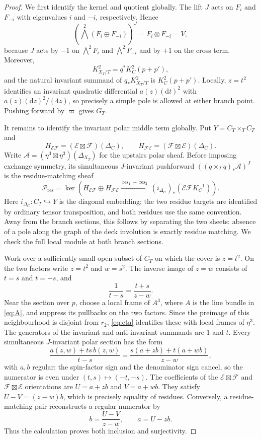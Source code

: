 \documentclass[11pt,a4paper,dvipsnames]{amsart}
\numberwithin{equation}{section}
\theoremstyle{plain}
\theoremstyle{definition}
\newcommand{\cE}{\mathcal E}
\newcommand{\cF}{\mathcal F}
\newcommand{\dd}{\mathrm d}
\begin{document}
\begin{proof}
We first identify the kernel and quotient globally.  The lift $J$ acts on
$F_i$ and $F_{-i}$ with eigenvalues $i$ and $-i$, respectively.  Hence
$$
 \left(\bigwedge^2(F_i\oplus F_{-i})\right)^J
 =F_i\otimes F_{-i}=V,
$$
because $J$ acts by $-1$ on $\bigwedge^2F_i$ and
$\bigwedge^2F_{-i}$ and by $+1$ on the cross term.  Moreover,
$$
 K_{X_T/T}^2=q^*K_C^2(p+p'),
$$
and the natural invariant summand of $q_*K_{X_T/T}^2$ is
$K_C^2(p+p')$.  Locally, $z=t^2$ identifies an invariant quadratic
differential $a(z)(\dd t)^2$ with
$a(z)(\dd z)^2/(4z)$, so precisely a simple pole is allowed at either
branch point.  Pushing forward by $\varpi$ gives $G_T$.

It remains to identify the invariant polar middle term globally.
Put $Y=C_T\times_T C_T$ and
$$
 H_{\cE\cF}=(\cE\boxtimes\cF)(\Delta_C),
 \qquad
 H_{\cF\cE}=(\cF\boxtimes\cE)(\Delta_C).
$$
Write
$\mathscr A=(\eta^3\boxtimes\eta^3)(\Delta_{X_T})$ for the upstairs
polar sheaf.  Before imposing exchange symmetry, its simultaneous
$J$-invariant pushforward $((q\times_Tq)_*\mathscr A)^J$ is the
residue-matching sheaf
$$
 \mathscr P_{\mathrm{res}}=
 \ker\!\left(
 H_{\cE\cF}\oplus H_{\cF\cE}
 \xrightarrow{\operatorname{res}_1-\operatorname{res}_2}
 (i_{\Delta_C})_*(\cE\cF K_C^{-1})
 \right).
$$
Here $i_{\Delta_C}:C_T\hookrightarrow Y$ is the diagonal embedding;
the two residue targets are identified by ordinary tensor transposition,
and both residues use the same convention.  Away from the branch
sections, this follows by separating the two sheets: absence of a pole
along the graph of the deck involution is exactly residue matching.
We check the full local module at both branch sections.

Work over a sufficiently small open subset of $C_T$ on which the cover
is $z=t^2$.  On the two factors write $z=t^2$ and $w=s^2$.
The inverse image of $z=w$ consists of $t=s$ and $t=-s$, and
\begin{equation}\label{eq:local-pole}
 \frac1{t-s}=\frac{t+s}{z-w}.
\end{equation}
Near the section over $p$, choose a local frame of $A^3$, where
$A$ is the line bundle in \eqref{eq:A}, and suppress its pullbacks on
the two factors.  Since the preimage of this neighbourhood is disjoint from $r_2$,
\eqref{eq:eta} identifies these with local frames of $\eta^3$.
The generators of the invariant and anti-invariant summands are $1$ and
$t$.  Every simultaneous $J$-invariant polar section has the form
$$
 \frac{a(z,w)+ts\,b(z,w)}{t-s}
 =\frac{s(a+zb)+t(a+wb)}{z-w},
$$
with $a,b$ regular: the spin-factor sign and the denominator sign cancel,
so the numerator is even under $(t,s)\mapsto(-t,-s)$.
The coefficients of the $\cE\boxtimes\cF$ and
$\cF\boxtimes\cE$ orientations are $U=a+zb$ and $V=a+wb$.
They satisfy $U-V=(z-w)b$, which is precisely equality of residues.
Conversely, a residue-matching pair reconstructs a regular numerator by
$$
 b=\frac{U-V}{z-w},\qquad a=U-zb.
$$
Thus the calculation proves both inclusion and surjectivity.


\end{proof}
\end{document}
